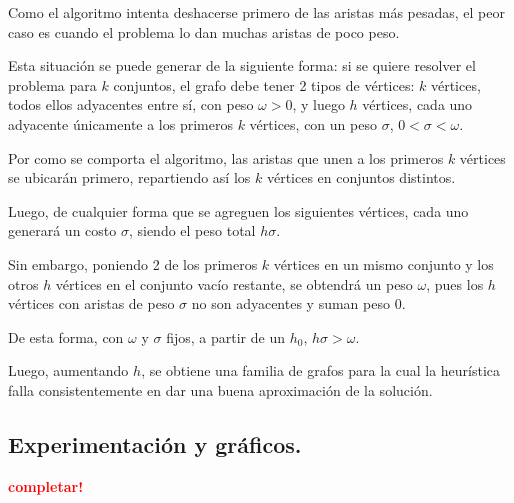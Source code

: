 Como el algoritmo intenta deshacerse primero de las aristas más pesadas, el
peor caso es cuando el problema lo dan muchas aristas de poco peso.

\vspace*{0.3cm}

Esta situación se puede generar de la siguiente forma: si se quiere
resolver el problema para $k$ conjuntos, el grafo debe tener 2 tipos de
vértices: $k$ vértices, todos ellos adyacentes entre sí, con peso
$\omega > 0$, y luego $h$ vértices, cada uno adyacente únicamente a los
primeros $k$ vértices, con un peso $\sigma$, $0 < \sigma < \omega$.

Por como se comporta el algoritmo, las aristas que unen a los primeros $k$
vértices se ubicarán primero, repartiendo
así los $k$ vértices en conjuntos distintos.

Luego, de cualquier forma que se agreguen los siguientes vértices,
cada uno generará un costo $\sigma$, siendo el peso total $h \sigma$.

Sin embargo, poniendo 2 de los primeros $k$ vértices en un mismo conjunto
y los otros $h$ vértices en el conjunto vacío restante, se obtendrá un peso
$\omega$, pues los $h$ vértices con aristas de peso
$\sigma$ no son adyacentes y suman peso $0$.

De esta forma, con $\omega$ y
$\sigma$ fijos, a partir de un $h_0$, $h \sigma > \omega$.

\vspace*{0.3cm}

Luego, aumentando $h$, se obtiene una familia de grafos para la cual
la heurística falla consistentemente en dar una buena aproximación de la solución.


\newpage \subsection{Experimentación y gráficos.}
\vspace*{0.3cm}

\textcolor{red}{\textbf{completar!}}

